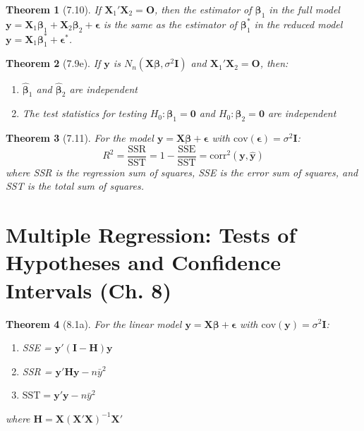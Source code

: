 \documentclass{article}
\newtheorem{theorem}{Theorem}[section]
\begin{document}
\begin{theorem}[7.10]
If $\mathbf{X}_1'\mathbf{X}_2 = \mathbf{O}$, then the estimator of $\boldsymbol{\beta}_1$ in the full model $\mathbf{y} = \mathbf{X}_1\boldsymbol{\beta}_1 + \mathbf{X}_2\boldsymbol{\beta}_2 + \boldsymbol{\epsilon}$ is the same as the estimator of $\boldsymbol{\beta}_1^*$ in the reduced model $\mathbf{y} = \mathbf{X}_1\boldsymbol{\beta}_1^* + \boldsymbol{\epsilon}^*$.
\end{theorem}

\begin{theorem}[7.9e]
If $\mathbf{y}$ is $N_n(\mathbf{X}\boldsymbol{\beta}, \sigma^2\mathbf{I})$ and $\mathbf{X}_1'\mathbf{X}_2 = \mathbf{O}$, then:
\begin{enumerate}[label=(\roman*)]
\item $\hat{\boldsymbol{\beta}}_1$ and $\hat{\boldsymbol{\beta}}_2$ are independent
\item The test statistics for testing $H_0: \boldsymbol{\beta}_1 = \mathbf{0}$ and $H_0: \boldsymbol{\beta}_2 = \mathbf{0}$ are independent
\end{enumerate}
\end{theorem}

\begin{theorem}[7.11]
For the model $\mathbf{y} = \mathbf{X}\boldsymbol{\beta} + \boldsymbol{\epsilon}$ with $\text{cov}(\boldsymbol{\epsilon}) = \sigma^2\mathbf{I}$:
\[R^2 = \frac{\text{SSR}}{\text{SST}} = 1 - \frac{\text{SSE}}{\text{SST}} = \text{corr}^2(\mathbf{y}, \hat{\mathbf{y}})\]
where SSR is the regression sum of squares, SSE is the error sum of squares, and SST is the total sum of squares.
\end{theorem}

\section{Multiple Regression: Tests of Hypotheses and Confidence Intervals (Ch. 8)}

\begin{theorem}[8.1a]
For the linear model $\mathbf{y} = \mathbf{X}\boldsymbol{\beta} + \boldsymbol{\epsilon}$ with $\text{cov}(\mathbf{y}) = \sigma^2\mathbf{I}$:
\begin{enumerate}[label=(\roman*)]
\item SSE = $\mathbf{y}'(\mathbf{I}-\mathbf{H})\mathbf{y}$
\item SSR = $\mathbf{y}'\mathbf{H}\mathbf{y} - n\bar{y}^2$
\item $\text{SST} = \mathbf{y}'\mathbf{y} - n\bar{y}^2$
\end{enumerate}
where $\mathbf{H} = \mathbf{X}(\mathbf{X}'\mathbf{X})^{-1}\mathbf{X}'$
\end{theorem}
\end{document}
